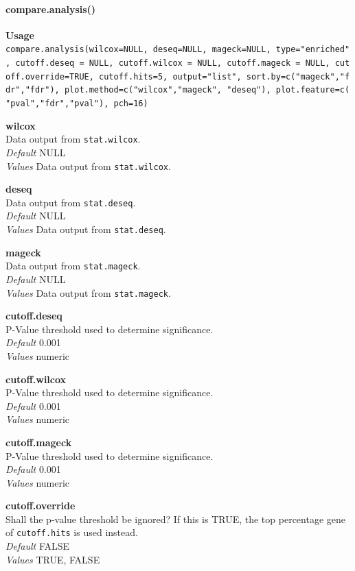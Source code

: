 \documentclass[]{article}
\let\oldparagraph\paragraph
\renewcommand{\paragraph}[1]{\oldparagraph{#1}\mbox{}}
\begin{document}
\paragraph{compare.analysis()}\label{compare.analysis}

\textbf{Usage}
\texttt{compare.analysis(wilcox=NULL,\ deseq=NULL,\ mageck=NULL,\ type="enriched",\ cutoff.deseq\ =\ NULL,\ cutoff.wilcox\ =\ NULL,\ cutoff.mageck\ =\ NULL,\ cutoff.override=TRUE,\ cutoff.hits=5,\ output="list",\ sort.by=c("mageck","fdr","fdr"),\ plot.method=c("wilcox","mageck",\ "deseq"),\ plot.feature=c("pval","fdr","pval"),\ pch=16)}

\textbf{wilcox}\\
Data output from \texttt{stat.wilcox}.\\
\emph{Default} NULL\\
\emph{Values} Data output from \texttt{stat.wilcox}.

\textbf{deseq}\\
Data output from \texttt{stat.deseq}.\\
\emph{Default} NULL\\
\emph{Values} Data output from \texttt{stat.deseq}.

\textbf{mageck}\\
Data output from \texttt{stat.mageck}.\\
\emph{Default} NULL\\
\emph{Values} Data output from \texttt{stat.mageck}.

\textbf{cutoff.deseq}\\
P-Value threshold used to determine significance.\\
\emph{Default} 0.001\\
\emph{Values} numeric

\textbf{cutoff.wilcox}\\
P-Value threshold used to determine significance.\\
\emph{Default} 0.001\\
\emph{Values} numeric

\textbf{cutoff.mageck}\\
P-Value threshold used to determine significance.\\
\emph{Default} 0.001\\
\emph{Values} numeric

\textbf{cutoff.override}\\
Shall the p-value threshold be ignored? If this is TRUE, the top
percentage gene of \texttt{cutoff.hits} is used instead.\\
\emph{Default} FALSE\\
\emph{Values} TRUE, FALSE
\end{document}
